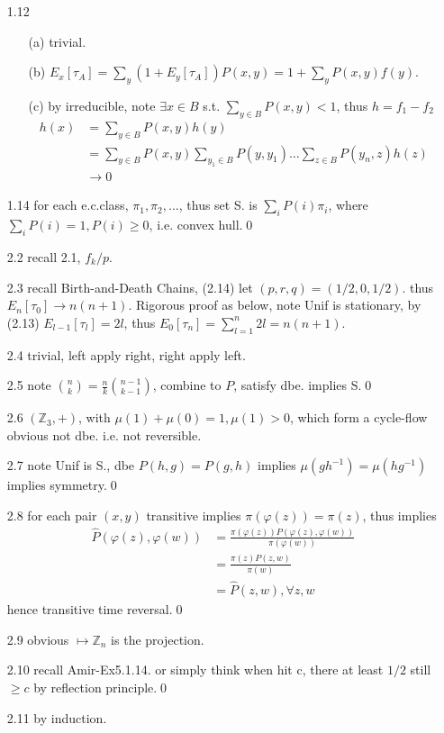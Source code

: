 \documentclass[paper=a4, fontsize=11pt]{scrartcl} %
\numberwithin{equation}{section} %
\numberwithin{figure}{section} %
\numberwithin{table}{section} %
\begin{document}
\begin{itemize}
	\item[1.12]
	\begin{itemize}
		\item[(a)] trivial.
		\item[(b)] $E_x[\tau_A] = \sum_y (1+E_y[\tau_A])P(x,y)= 1 + \sum_y P(x,y)f(y)$.
		\item[(c)] by irreducible, note $\exists x\in B$ s.t. $\sum_{y\in B}P(x,y)<1$, thus $h=f_1-f_2$
		\begin{align}
			h(x) &= \sum_{y\in B}P(x,y)h(y)\\
				&= \sum_{y\in B}P(x,y)\sum_{y_1\in B}P(y,y_1)\dots\sum_{z\in B}P(y_n,z)h(z)\\
				&\rightarrow 0
		\end{align}
	\end{itemize}
	\item[1.14] for each e.c.class, $\pi_1,\pi_2,...$, thus set S. is $\sum_i P(i)\pi_i$, where $\sum_i P(i)=1, P(i)\geq 0$, i.e. convex hull.\qed
	\item[2.2] recall 2.1, $f_k/p$.
	\item[2.3] recall Birth-and-Death Chains, (2.14) let $(p,r,q)=(1/2,0,1/2)$. thus $E_n[\tau_0] \rightarrow n(n+1)$. Rigorous proof as below, note Unif is stationary, by (2.13) $E_{l-1}[\tau_l]=2l$, thus $E_0[\tau_n]=\sum_{l=1}^n 2l=n(n+1)$.
	\item[2.4] trivial, left apply right, right apply left.
	\item[2.5] note ${n \choose k} = \frac{n}{k} {n-1 \choose k-1}$, combine to $P$, satisfy dbe. implies S.\qed
	\item[2.6] $(\mathbb{Z}_3,+)$, with $\mu(1)+\mu(0)=1,\mu(1)>0$, which form a cycle-flow obvious not dbe. i.e. not reversible.
	\item[2.7] note Unif is S., dbe $P(h,g)=P(g,h)$ implies $\mu(gh^{-1})=\mu(hg^{-1})$ implies symmetry.\qed
	\item[2.8] for each pair $(x,y)$ transitive implies $\pi(\varphi(z))=\pi(z)$, thus implies 
	\begin{align}
		\widehat{P}(\varphi(z),\varphi(w)) &= \frac{\pi(\varphi(z))P(\varphi(z),\varphi(w))}{\pi(\varphi(w))}\\
			&= \frac{\pi(z)P(z,w)}{\pi(w)}\\
			&= \widehat{P}(z,w), \forall z,w
	\end{align}
	hence transitive time reversal.\qed
	\item[2.9] obvious $\mapsto \mathbb{Z}_n$ is the projection.
	\item[2.10] recall Amir-Ex5.1.14. or simply think when hit c, there at least $1/2$ still $\geq c$ by reflection principle.\qed
	\item[2.11] by induction.
\end{itemize}
\end{document}
